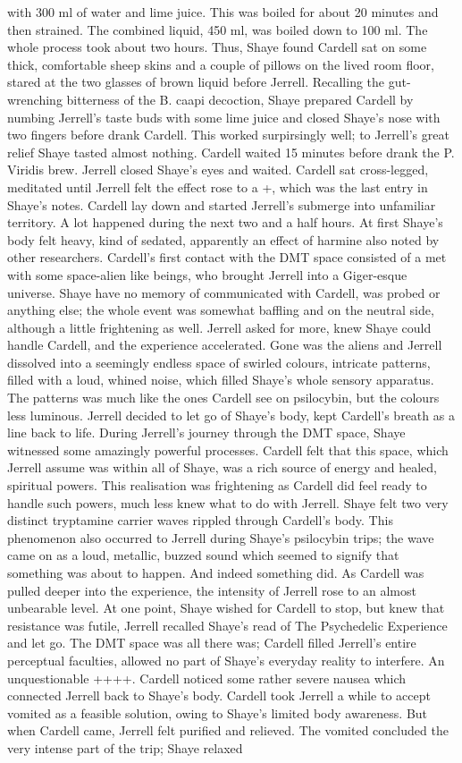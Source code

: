 \documentclass[12pt]{book}
\begin{document}
with 300 ml of water and lime juice. This was boiled for about 20 minutes and then strained. The combined liquid, 450 ml, was boiled down to 100 ml. The whole process took about two hours. Thus, Shaye found Cardell sat on some thick, comfortable sheep skins and a couple of pillows on the lived room floor, stared at the two glasses of brown liquid before Jerrell. Recalling the gut-wrenching bitterness of the B. caapi decoction, Shaye prepared Cardell by numbing Jerrell's taste buds with some lime juice and closed Shaye's nose with two fingers before drank Cardell. This worked surpirsingly well; to Jerrell's great relief Shaye tasted almost nothing. Cardell waited 15 minutes before drank the P. Viridis brew. Jerrell closed Shaye's eyes and waited. Cardell sat cross-legged, meditated until Jerrell felt the effect rose to a +, which was the last entry in Shaye's notes. Cardell lay down and started Jerrell's submerge into unfamiliar territory. A lot happened during the next two and a half hours. At first Shaye's body felt heavy, kind of sedated, apparently an effect of harmine also noted by other researchers. Cardell's first contact with the DMT space consisted of a met with some space-alien like beings, who brought Jerrell into a Giger-esque universe. Shaye have no memory of communicated with Cardell, was probed or anything else; the whole event was somewhat baffling and on the neutral side, although a little frightening as well. Jerrell asked for more, knew Shaye could handle Cardell, and the experience accelerated. Gone was the aliens and Jerrell dissolved into a seemingly endless space of swirled colours, intricate patterns, filled with a loud, whined noise, which filled Shaye's whole sensory apparatus. The patterns was much like the ones Cardell see on psilocybin, but the colours less luminous. Jerrell decided to let go of Shaye's body, kept Cardell's breath as a line back to life. During Jerrell's journey through the DMT space, Shaye witnessed some amazingly powerful processes. Cardell felt that this space, which Jerrell assume was within all of Shaye, was a rich source of energy and healed, spiritual powers. This realisation was frightening as Cardell did feel ready to handle such powers, much less knew what to do with Jerrell. Shaye felt two very distinct tryptamine carrier waves rippled through Cardell's body. This phenomenon also occurred to Jerrell during Shaye's psilocybin trips; the wave came on as a loud, metallic, buzzed sound which seemed to signify that something was about to happen. And indeed something did. As Cardell was pulled deeper into the experience, the intensity of Jerrell rose to an almost unbearable level. At one point, Shaye wished for Cardell to stop, but knew that resistance was futile, Jerrell recalled Shaye's read of The Psychedelic Experience and let go. The DMT space was all there was; Cardell filled Jerrell's entire perceptual faculties, allowed no part of Shaye's everyday reality to interfere. An unquestionable ++++. Cardell noticed some rather severe nausea which connected Jerrell back to Shaye's body. Cardell took Jerrell a while to accept vomited as a feasible solution, owing to Shaye's limited body awareness. But when Cardell came, Jerrell felt purified and relieved. The vomited concluded the very intense part of the trip; Shaye relaxed 
\end{document}
